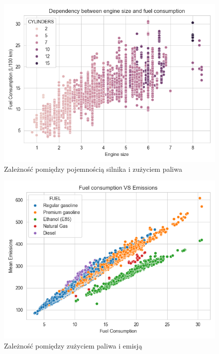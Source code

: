 \documentclass[9pt,a4paper,twoside]{rho}
\begin{document}
        \begin{figure}[H]
            \centering
            \includegraphics[width=1\columnwidth]{plots/Dependency between engine size and fuel consumption.png}
            \caption{Zależność pomiędzy pojemnością silnika i zużyciem paliwa}
            \label{fig:engine_size_vs_fuel_cons}
        \end{figure}
    
        \begin{figure}[H]
            \centering
            \includegraphics[width=1\columnwidth]{plots/Fuel consumption VS Emissions.png}
            \caption{Zależność pomiędzy zużyciem paliwa i emisją}
            \label{fig:fuel_cons_vs_emissions}
        \end{figure}
    
\end{document}
